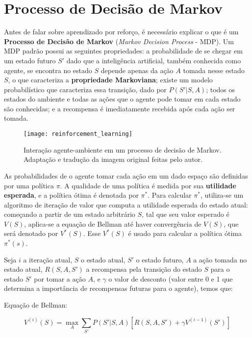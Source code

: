 \section{Processo de Decisão de Markov}
\label{sec:mdp}

Antes de falar sobre aprendizado por reforço, é necessário explicar o que é um \textbf{Processo de Decisão de Markov} (\textit{Markov Decision Process} - MDP).
Um MDP padrão possui as seguintes propriedades:
a probabilidade de se chegar em um estado futuro $S'$ dado que a inteligência artificial, também conhecida como agente, se encontra no estado $S$ depende apenas da ação $A$ tomada nesse estado $S$, o que caracteriza a \textbf{propriedade Markoviana};
existe um modelo probabilístico que caracteriza essa transição, dado por $P(S'|S,A)$;
todos os estados do ambiente e todas as ações que o agente pode tomar em cada estado são conhecidas;
e a recompensa é imediatamente recebida após cada ação ser tomada.

\begin{figure}[h!]
\texttt{[image: reinforcement\_learning]}
\centering
\caption{Interação agente-ambiente em um processo de decisão de Markov\cite{sutton2018reinforcement}. Adaptação e tradução da imagem original feitas pelo autor.}
\end{figure}

As probabilidades de o agente tomar cada ação em um dado espaço são definidas por uma política $\pi$.
A qualidade de uma política é medida por sua \textbf{utilidade esperada}, e a política ótima é denotada por $\pi^{*}$.
Para calcular $\pi^{*}$, utiliza-se um algoritmo de iteração de valor que computa a utilidade esperada do estado atual:
começando a partir de um estado arbitrário $S$, tal que seu valor esperado é $V(S)$, aplica-se a equação de Bellman até haver convergência de $V(S)$, que será denotado por $V^{*}(S)$.
Esse $V^{*}(S)$ é usado para calcular a política ótima $\pi^{*}(s)$.

Seja $i$ a iteração atual, $S$ o estado atual, $S'$ o estado futuro, $A$ a ação tomada no estado atual, $R(S,A,S')$ a recompensa pela transição do estado $S$ para o estado $S'$ por tomar a ação $A$, e $\gamma$ o valor de desconto (valor entre 0 e 1 que determina a importância de recompensas futuras para o agente), temos que:

Equação de Bellman:

\begin{equation} \label{eq:bellman}
V^{(i)}(S) = \max_{A}\sum_{S'}P(S'|S,A)[R(S,A,S') + \gamma V^{(i-1)}(S')]
\end{equation}

